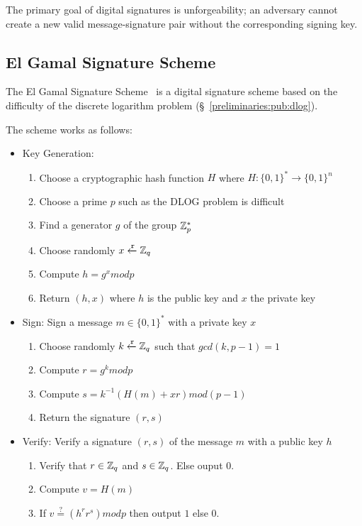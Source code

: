 The primary goal of digital signatures is unforgeability; an adversary cannot create a new valid message-signature pair without the corresponding signing key.

\subsection{El Gamal Signature Scheme}
\label{preliminaries:sign:el_gamal}

The El Gamal Signature Scheme~\cite{el_gamal} is a digital signature scheme based on the difficulty of the discrete logarithm problem (§~\ref{preliminaries:pub:dlog}).

The scheme works as follows:

\begin{itemize}
  \item Key Generation:
    \begin{enumerate}
      \item Choose a cryptographic hash function $H$ where $H: \{0, 1\}^{*} \rightarrow \{0, 1\}^{n}$
      \item Choose a prime $p$ such as the DLOG problem is difficult
      \item Find a generator $g$ of the group $\mathbb{Z}^{*}_{p}$
      \item Choose randomly $x \xleftarrow{\mathtt{r}}{\mathbb{Z}_q}$
      \item Compute $h = g^{x} modp$
      \item Return $(h, x)$ where $h$ is the public key and $x$ the private key
    \end{enumerate}
  \item Sign: Sign a message $m \in \{0, 1\}^{*}$ with a private key $x$
    \begin{enumerate}
      \item Choose randomly $k \xleftarrow{\mathtt{r}}{\mathbb{Z}_q}$ such that $gcd(k, p - 1) = 1$
      \item Compute $r = g^{k}modp$
      \item Compute $s = k^{-1}(H(m) + xr) mod(p - 1)$
      \item Return the signature $(r, s)$
    \end{enumerate}
  \item Verify: Verify a signature $(r, s)$ of the message $m$ with a public key $h$
    \begin{enumerate}
      \item Verify that $r \in \mathbb{Z}_q$ and $s \in \mathbb{Z}_q$. Else ouput $0$.
      \item Compute $v = H(m)$
      \item If $v \stackrel{?}{=} (h^{r}r^{s}) modp$ then output $1$ else $0$.
    \end{enumerate}
\end{itemize}

